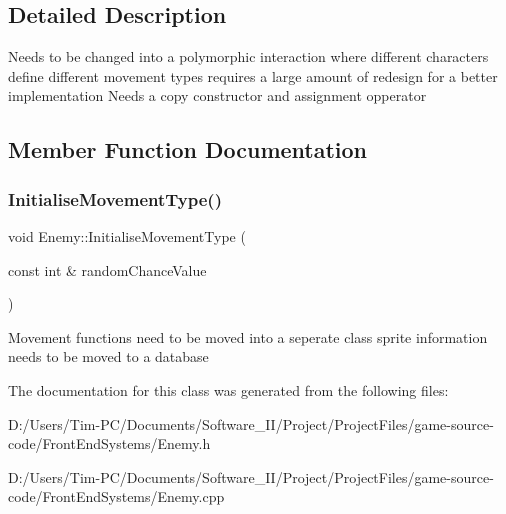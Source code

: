 \subsection{Detailed Description}
Needs to be changed into a polymorphic interaction where different characters define different movement types requires a large amount of redesign for a better implementation Needs a copy constructor and assignment opperator 

\subsection{Member Function Documentation}
\mbox{\label{class_enemy_adcd3f46bb06898b340f50c4a22bb3f68}} 
\subsubsection{\texorpdfstring{Initialise\+Movement\+Type()}{InitialiseMovementType()}}
{\footnotesize\ttfamily void Enemy\+::\+Initialise\+Movement\+Type (\begin{DoxyParamCaption}\item[{const int \&}]{random\+Chance\+Value }\end{DoxyParamCaption})\hspace{0.3cm}{\ttfamily [private]}}

Movement functions need to be moved into a seperate class sprite information needs to be moved to a database 

The documentation for this class was generated from the following files\+:\begin{DoxyCompactItemize}
\item 
D\+:/\+Users/\+Tim-\/\+P\+C/\+Documents/\+Software\+\_\+\+I\+I/\+Project/\+Project\+Files/game-\/source-\/code/\+Front\+End\+Systems/Enemy.\+h\item 
D\+:/\+Users/\+Tim-\/\+P\+C/\+Documents/\+Software\+\_\+\+I\+I/\+Project/\+Project\+Files/game-\/source-\/code/\+Front\+End\+Systems/Enemy.\+cpp\end{DoxyCompactItemize}
